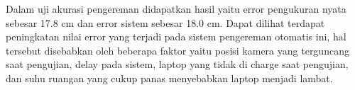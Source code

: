 Dalam uji akurasi pengereman didapatkan hasil yaitu error pengukuran nyata sebesar  17.8 cm dan error sistem sebesar  18.0 cm. Dapat dilihat terdapat peningkatan nilai error yang terjadi pada sistem pengereman otomatis ini, hal tersebut disebabkan oleh beberapa faktor yaitu posisi kamera yang terguncang saat pengujian, delay pada sistem, laptop yang tidak di charge saat pengujian, dan suhu ruangan yang cukup panas menyebabkan laptop menjadi lambat. 